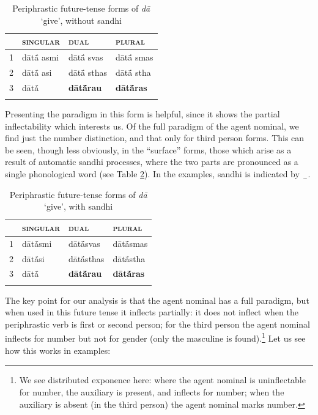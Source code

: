 \documentclass[output=paper,colorlinks,citecolor=brown]{langscibook}
\begin{document}
\begin{table}[ht]
	\centering
	\caption{Periphrastic future-tense forms of \textit{dā} ‘give’, without sandhi \citep[111]{stump2013}}
	\label{01tab13}
	\begin{tabularx}{0.7\textwidth}{XXXX}
		\lsptoprule
		& \textsc{singular} & \textsc{dual} & \textsc{plural} \\
		\midrule
		1 & dātā́ asmi & dātā́ svas & dātā́ smas \\
		2 & dātā́ asi & dātā́ sthas & dātā́ stha \\
		3 & dātā́ & {\charis\small \textbf{dātā́rau}} & {\charis\small \textbf{dātā́ras}} \\
		\lspbottomrule
	\end{tabularx}
\end{table}

Presenting the paradigm in this form is helpful, since it shows the partial inflectability which interests us. Of the full paradigm of the agent nominal, we find just the number distinction, and that only for third person forms. This can be seen, though less obviously, in the ``surface'' forms, those which arise as a result of automatic sandhi processes, where the two parts are pronounced as a single phonological word (see Table \ref{01tab14}). In the examples, sandhi is indicated by {\charis ‿}.

\begin{table}[ht]
	\centering
	\caption{Periphrastic future-tense forms of \textit{dā} ‘give’, with sandhi \citep[111]{stump2013}}
	\label{01tab14}
	\begin{tabularx}{0.6\textwidth}{XXXX}
		\lsptoprule
		& \textsc{singular} & \textsc{dual} & \textsc{plural} \\
		\midrule
		1 & dātā́smi & dātā́svas & dātā́smas \\
		2 & dātā́si & dātā́sthas & dātā́stha \\
		3 & dātā́ & {\charis\small \textbf{dātā́rau}} & {\charis\small \textbf{dātā́ras}} \\
		\lspbottomrule
	\end{tabularx}
\end{table}

\largerpage[2]
The key point for our analysis is that the agent nominal has a full paradigm, but when used in this future tense it inflects partially: it does not inflect when the periphrastic verb is first or second person; for the third person the agent nominal inflects for number but not for gender (only the masculine is found).\footnote{We see distributed exponence here: where the agent nominal is uninflectable for number, the auxiliary is present, and inflects for number; when the auxiliary is absent (in the third person) the agent nominal marks number.} Let us see how this works in examples:
\end{document}
